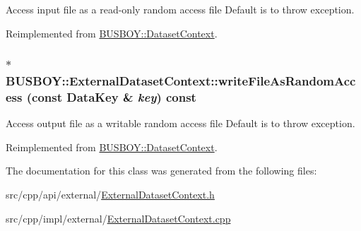 Access input file as a read-\/only random access file Default is to throw exception. 

Reimplemented from \hyperlink{classBUSBOY_1_1DatasetContext_a371cee56375e6052f1626a525bc35a61}{BUSBOY::DatasetContext}.\hypertarget{classBUSBOY_1_1ExternalDatasetContext_a6f81aca310286df497632e916e555bee}{
\subsubsection[{writeFileAsRandomAccess}]{ $\ast$ BUSBOY::ExternalDatasetContext::writeFileAsRandomAccess (const {\bf DataKey} \& {\em key}) const}}
\label{classBUSBOY_1_1ExternalDatasetContext_a6f81aca310286df497632e916e555bee}


Access output file as a writable random access file Default is to throw exception. 

Reimplemented from \hyperlink{classBUSBOY_1_1DatasetContext_a9137476c998215cdd6e1434c4325c154}{BUSBOY::DatasetContext}.

The documentation for this class was generated from the following files:\begin{DoxyCompactItemize}
\item 
src/cpp/api/external/\hyperlink{ExternalDatasetContext_8h}{ExternalDatasetContext.h}\item 
src/cpp/impl/external/\hyperlink{ExternalDatasetContext_8cpp}{ExternalDatasetContext.cpp}\end{DoxyCompactItemize}
